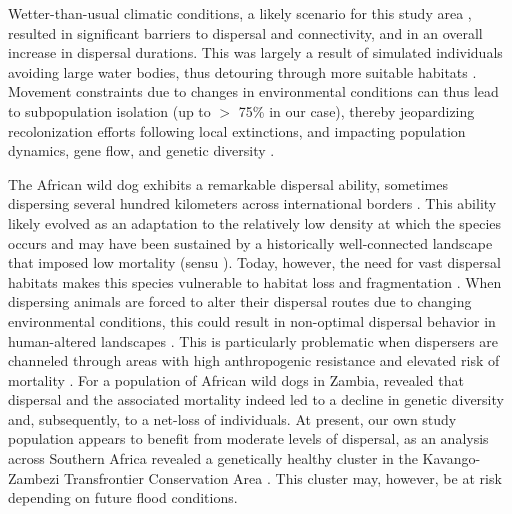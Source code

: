 \documentclass[abstract=on,10pt,a4paper,bibliography=totocnumbered]{article}
\begin{document}
Wetter-than-usual climatic conditions, a likely scenario for this study area
\citep{Wolski.2008, IPCC.2022}, resulted in significant barriers to dispersal
and connectivity, and in an overall increase in dispersal durations. This was
largely a result of simulated individuals avoiding large water bodies, thus
detouring through more suitable habitats \citep{Cozzi.2013, Cozzi.2020,
Hofmann.2021, Hofmann.2023}. Movement constraints due to changes in
environmental conditions can thus lead to subpopulation isolation (up to $>$
75\% in our case), thereby jeopardizing recolonization efforts following local
extinctions, and impacting population dynamics, gene flow, and genetic
diversity \citep{Hanski.1999, Frankham.2002, Leigh.2012, Baguette.2013}.

The African wild dog exhibits a remarkable dispersal ability, sometimes
dispersing several hundred kilometers across international borders
\citep{McNutt.1996, Davies-Mostert.2012, Masenga.2016, Cozzi.2020,
Sandoval-Seres.2022, Cozzi.2023}. This ability likely evolved as an adaptation
to the relatively low density at which the species occurs \citep{Creel.2002,
Masenga.2016} and may have been sustained by a historically well-connected
landscape that imposed low mortality (sensu \citealp{Fahrig.2007}). Today,
however, the need for vast dispersal habitats makes this species vulnerable to
habitat loss and fragmentation \citep{Woodroffe.2012, Woodroffe.2020}. When
dispersing animals are forced to alter their dispersal routes due to changing
environmental conditions, this could result in non-optimal dispersal behavior in
human-altered landscapes \citep{Fahrig.2007}. This is particularly problematic
when dispersers are channeled through areas with high anthropogenic resistance
and elevated risk of mortality \citep{Fahrig.2007, Ghoddousi.2021,
VanDerMeer.2014}. For a population of African wild dogs in Zambia,
\citet{Leigh.2012} revealed that dispersal and the associated mortality indeed
led to a decline in genetic diversity and, subsequently, to a net-loss of
individuals. At present, our own study population appears to benefit from
moderate levels of dispersal, as an analysis across Southern Africa revealed a
genetically healthy cluster in the Kavango-Zambezi Transfrontier Conservation
Area \citep{Tensen.2022}. This cluster may, however, be at risk depending on
future flood conditions.
\end{document}
